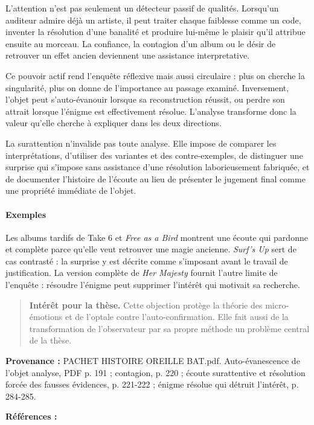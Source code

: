 \documentclass[10pt,a4paper]{article}
\begin{document}
L'attention n'est pas seulement un détecteur passif de qualités. Lorsqu'un auditeur admire déjà un artiste, il peut traiter chaque faiblesse comme un code, inventer la résolution d'une banalité et produire lui-même le plaisir qu'il attribue ensuite au morceau. La confiance, la contagion d'un album ou le désir de retrouver un effet ancien deviennent une assistance interpretative.

Ce pouvoir actif rend l'enquête réflexive mais aussi circulaire : plus on cherche la singularité, plus on donne de l'importance au passage examiné. Inversement, l'objet peut s'auto-évanouir lorsque sa reconstruction réussit, ou perdre son attrait lorsque l'énigme est effectivement résolue. L'analyse transforme donc la valeur qu'elle cherche à expliquer dans les deux directions.

La surattention n'invalide pas toute analyse. Elle impose de comparer les interprétations, d'utiliser des variantes et des contre-exemples, de distinguer une surprise qui s'impose sans assistance d'une résolution laborieusement fabriquée, et de documenter l'histoire de l'écoute au lieu de présenter le jugement final comme une propriété immédiate de l'objet.

\paragraph{Exemples}
Les albums tardifs de Take 6 et \emph{Free as a Bird} montrent une écoute qui pardonne et complète parce qu'elle veut retrouver une magie ancienne. \emph{Surf's Up} sert de cas contrasté : la surprise y est décrite comme s'imposant avant le travail de justification. La version complète de \emph{Her Majesty} fournit l'autre limite de l'enquête : résoudre l'énigme peut supprimer l'intérêt qui motivait sa recherche.

\begin{quote}
\textbf{Intérêt pour la thèse.} Cette objection protège la théorie des micro-émotions et de l'optale contre l'auto-confirmation. Elle fait aussi de la transformation de l'observateur par sa propre méthode un problème central de la thèse.
\end{quote}
{\footnotesize\color{metadata}\textbf{Provenance :} PACHET HISTOIRE OREILLE BAT.pdf. Auto-évanescence de l'objet analyse, PDF p. 191 ; contagion, p. 220 ; écoute surattentive et résolution forcée des fausses évidences, p. 221-222 ; énigme résolue qui détruit l'intérêt, p. 284-285.\par}
{\footnotesize\color{metadata}\textbf{Références :} \parencite{pachet2018oreille}\par}
\end{document}
